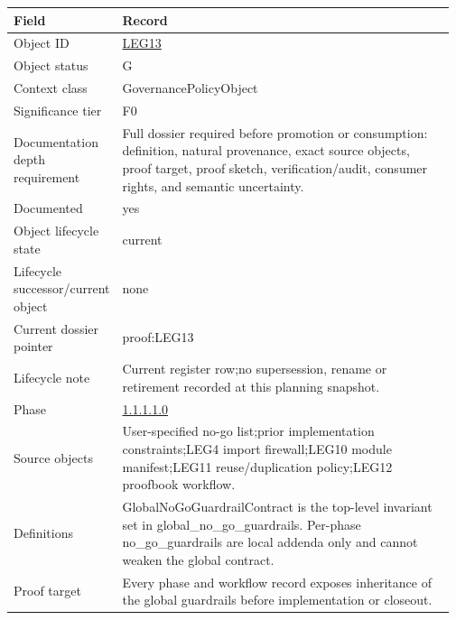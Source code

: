 \begin{longtable}{L{0.16\linewidth} L{0.81\linewidth}}
\hline
\textbf{Field} & \textbf{Record}\\
\hline
Object ID & \hyperlink{object-row-LEG13}{LEG13}\\
\hline\addlinespace[0.20em]
Object status & G\\
\hline\addlinespace[0.20em]
Context class & GovernancePolicyObject\\
\hline\addlinespace[0.20em]
Significance tier & F0\\
\hline\addlinespace[0.20em]
Documentation depth requirement & Full dossier required before promotion or consumption: definition, natural provenance, exact source objects, proof target, proof sketch, verification/\allowbreak{}audit, consumer rights, and semantic uncertainty.\\
\hline\addlinespace[0.20em]
Documented & yes\\
\hline\addlinespace[0.20em]
Object lifecycle state & current\\
\hline\addlinespace[0.20em]
Lifecycle successor/\allowbreak{}current object & none\\
\hline\addlinespace[0.20em]
Current dossier pointer & proof:LEG13\\
\hline\addlinespace[0.20em]
Lifecycle note & Current register row;\newline no supersession, rename or retirement recorded at this planning snapshot.\\
\hline\addlinespace[0.20em]
Phase & \hyperlink{phase-row-1-1-1-1-0}{1.1.1.1.0}\\
\hline\addlinespace[0.20em]
Source objects & User-specified no-go list;\newline prior implementation constraints;\newline LEG4 import firewall;\newline LEG10 module manifest;\newline LEG11 reuse/\allowbreak{}duplication policy;\newline LEG12 proofbook workflow.\\
\hline\addlinespace[0.20em]
Definitions & GlobalNoGoGuardrailContract is the top-level invariant set in global\_no\_go\_guardrails. Per-phase no\_go\_guardrails are local addenda only and cannot weaken the global contract.\\
\hline\addlinespace[0.20em]
Proof target & Every phase and workflow record exposes inheritance of the global guardrails before implementation or closeout.\\

\end{longtable}
